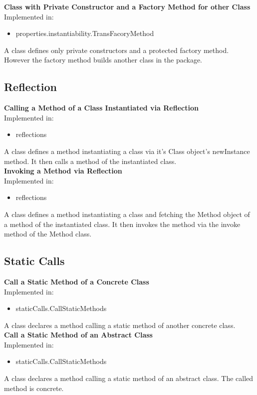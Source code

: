 \documentclass{article}
\begin{document}
\noindent
\textbf{Class with Private Constructor and a Factory Method for other Class}\\
Implemented in: 
\begin{itemize}
    \item properties.instantiability.TransFacoryMethod
\end{itemize}
A class defines only private constructors and a protected factory method. However the factory method builds another class in the package.\\

\subsection{Reflection}

\textbf{Calling a Method of a Class Instantiated via Reflection}\\
Implemented in: 
\begin{itemize}
    \item reflections
\end{itemize}
A class defines a method instantiating a class via it's Class object's newInstance method. It then calls a method of the instantiated class.\\

\noindent
\textbf{Invoking a Method via Reflection}\\
Implemented in: 
\begin{itemize}
    \item reflections
\end{itemize}
A class defines a method instantiating a class and fetching the Method object of a method of the instantiated class. It then invokes the method via the invoke method of the Method class.\\

\subsection{Static Calls}

\textbf{Call a Static Method of a Concrete Class}\\
Implemented in: 
\begin{itemize}
    \item staticCalls.CallStaticMethods
\end{itemize}
A class declares a method calling a static method of another concrete class.\\

\noindent
\textbf{Call a Static Method of an Abstract Class}\\
Implemented in: 
\begin{itemize}
    \item staticCalls.CallStaticMethods
\end{itemize}
A class declares a method calling a static method of an abstract class. The called method is concrete.\\
\end{document}
